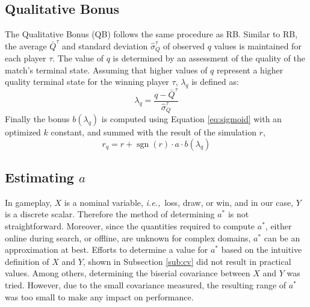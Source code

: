 \documentclass{ecai2014}
\newcommand{\sgn}{\mathop{\mathrm{sgn}}}
\newcommand{\ie}{{\it i.e.,}~}
\begin{document}
\subsection{Qualitative Bonus}
\label{subsec:qb}
The Qualitative Bonus (QB) follows the same procedure as RB. Similar to RB, the average $\bar{Q}^\tau$ and standard deviation $\hat{\sigma}^\tau_Q$ of observed $q$ values is maintained for each player $\tau$. The value of $q$ is determined by an assessment of the quality of the match's terminal state. Assuming that higher values of $q$ represent a higher quality terminal state for the winning player $\tau$, $\lambda_q$ is defined as:
\begin{equation}
\lambda_q = \frac{q - \bar{Q}^\tau}{\hat{\sigma}^\tau_Q}
\label{eq:qb_norm}
\end{equation}
Finally the bonus $b(\lambda_q)$ is computed using Equation \ref{eq:sigmoid} with an optimized $k$ constant, and summed with the result of the simulation $r$,
\begin{equation}
r_q=r+\sgn(r) \cdot a \cdot b(\lambda_q)
\label{eq:qb}
\end{equation}

\subsection{Estimating $a$}
\label{subsec:astar}
In gameplay, $X$ is a nominal variable, \ie loss, draw, or win, and in our case, $Y$ is a discrete scalar. Therefore the method of determining $a^*$ is not straightforward. Moreover, since the quantities required to compute $a^*$, either online during search, or offline, are unknown for complex domains, $a^*$ can be an approximation at best. 
Efforts to determine a value for $a^*$ based on the intuitive definition of $X$ and $Y$, shown in Subsection \ref{sub:cv} did not result in practical values. Among others, determining the biserial covariance between $X$ and $Y$ was tried. However, due to the small covariance measured, the resulting range of $a^*$ was too small to make any impact on performance.

\end{document}
